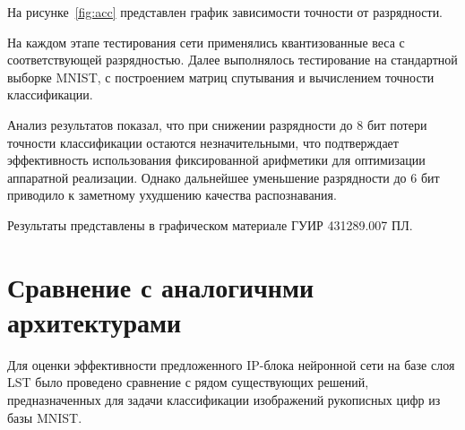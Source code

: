   На рисунке~\ref{fig:acc} представлен график зависимости точности от 
разрядности.


На каждом этапе тестирования сети применялись квантизованные веса с 
соответствующей разрядностью. Далее выполнялось тестирование на стандартной 
выборке MNIST, с построением матриц спутывания и вычислением точности 
классификации.

Анализ результатов показал, что при снижении разрядности до 8 бит потери 
точности классификации остаются незначительными, что подтверждает эффективность 
использования фиксированной арифметики для оптимизации аппаратной реализации. 
Однако дальнейшее уменьшение разрядности до 6 бит приводило к заметному 
ухудшению качества распознавания.

Результаты представлены в графическом материале ГУИР 431289.007 ПЛ.

\section{Сравнение с аналогичнми архитектурами}\par
\hspace*{12.5 mm}Для оценки эффективности предложенного IP-блока нейронной сети 
на базе слоя LST было проведено сравнение с рядом существующих решений, 
предназначенных для задачи классификации изображений рукописных цифр из базы
MNIST.

